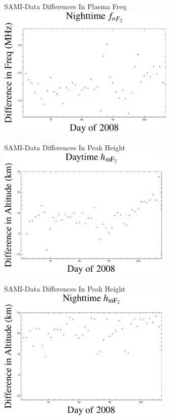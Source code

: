 \documentclass{beamer}
\begin{document}
\begin{frame}{SAMI-Data Differences In Plasma Freq}
  \includegraphics[height=2.5in]{nightf}
\end{frame}

\begin{frame}{SAMI-Data Differences In Peak Height}
  \includegraphics[height=2.5in]{dayh}
\end{frame}

\begin{frame}{SAMI-Data Differences In Peak Height}
  \includegraphics[height=2.5in]{nighth}
\end{frame}
 
\end{document}
